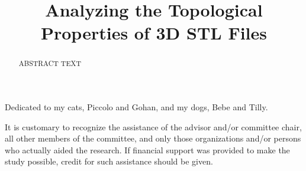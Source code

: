 \documentclass[ma]{uncgdissertationexp2}
\title{Analyzing the Topological Properties of 3D STL Files}
\theoremstyle{plain}
\theoremstyle{definition}
\theoremstyle{remark}
\begin{document}
\frontmatter      %

\begin{abstract}
ABSTRACT TEXT 
\end{abstract}

\maketitlepage  

\makecopyrightpage

\begin{dedication}
Dedicated to my cats, Piccolo and Gohan, and my dogs, Bebe and Tilly.
\end{dedication}

\makeapprovalpage

\begin{acknowledgments}
It is customary to recognize the assistance of the advisor and/or
committee chair, all other members of the committee, and only those
organizations and/or persons who actually aided the research. If
financial support was provided to make the study possible, credit for
such assistance should be given.
\end{acknowledgments}
\end{document}
